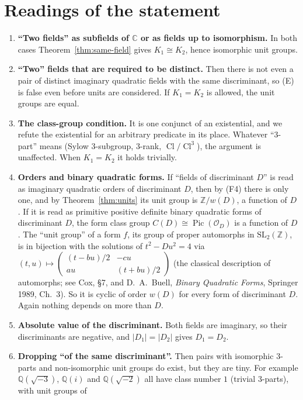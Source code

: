 \documentclass[11pt]{article}
\theoremstyle{definition}
\theoremstyle{remark}
\newcommand{\Q}{\mathbb{Q}}
\newcommand{\Z}{\mathbb{Z}}
\newcommand{\C}{\mathbb{C}}
\newcommand{\OO}{\mathcal{O}}
\newcommand{\Cl}{\operatorname{Cl}}
\begin{document}
\section{Readings of the statement}\label{sec:readings}
\begin{enumerate}
\item \textbf{``Two fields'' as subfields of $\C$ or as fields up to isomorphism.} In both cases
Theorem~\ref{thm:same-field} gives $K_1\cong K_2$, hence isomorphic unit groups.
\item \textbf{``Two'' fields that are required to be distinct.} Then there is not even a pair
of distinct imaginary quadratic fields with the same discriminant, so (E) is false even before
units are considered. If $K_1=K_2$ is allowed, the unit groups are equal.
\item \textbf{The class-group condition.} It is one conjunct of an existential, and we refute
the existential for an arbitrary predicate in its place. Whatever ``$3$-part'' means (Sylow
$3$-subgroup, $3$-rank, $\Cl/\Cl^3$), the argument is unaffected. When $K_1=K_2$ it holds
trivially.
\item \textbf{Orders and binary quadratic forms.} If ``fields of discriminant $D$'' is read as
imaginary quadratic orders of discriminant $D$, then by (F4) there is only one, and by
Theorem~\ref{thm:units} its unit group is $\Z/w(D)$, a function of $D$. If it is read as
primitive positive definite binary quadratic forms of discriminant $D$, the form class group
$C(D)\cong\operatorname{Pic}(\OO_D)$ is a function of $D$. The ``unit group'' of a form $f$, its
group of proper automorphs in $\mathrm{SL}_2(\Z)$, is in bijection with the solutions of
$t^2-Du^2=4$ via $(t,u)\mapsto\begin{pmatrix}(t-bu)/2&-cu\\au&(t+bu)/2\end{pmatrix}$ (the classical
description of automorphs; see Cox, \S7, and D.~A.~Buell, \emph{Binary Quadratic Forms},
Springer 1989, Ch.~3). So it is cyclic of
order $w(D)$ for every form of discriminant $D$. Again nothing depends on more than $D$.
\item \textbf{Absolute value of the discriminant.} Both fields are imaginary, so their
discriminants are negative, and $|D_1|=|D_2|$ gives $D_1=D_2$.
\item \textbf{Dropping ``of the same discriminant''.} Then pairs with isomorphic $3$-parts and
non-isomorphic unit groups do exist, but they are tiny. For example $\Q(\sqrt{-3})$,
$\Q(i)$ and $\Q(\sqrt{-2})$ all have class number $1$ (trivial $3$-parts), with unit groups of

\end{enumerate}
\end{document}
